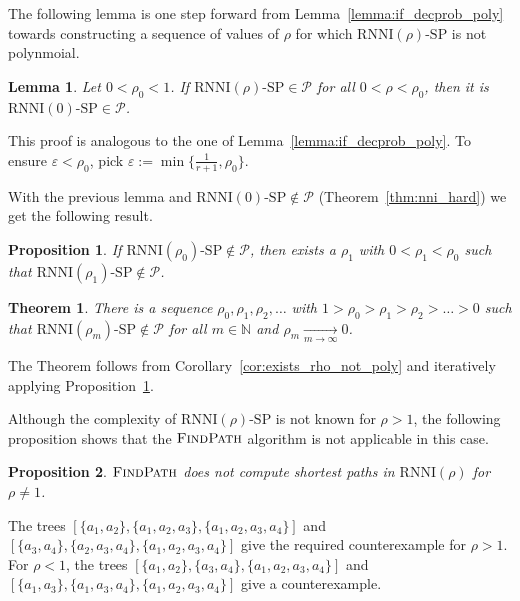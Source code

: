 \documentclass[11pt]{amsart}
\newtheorem{proposition}{Proposition}
\newtheorem{theorem}{Theorem}
\newtheorem{lemma}{Lemma}
\newcommand{\rnni}{\mathrm{RNNI}}
\newcommand{\findpath}{\textsc{FindPath}}
\newcommand{\p}{\mathcal{P}}
\newcommand{\decprob}[1]{\rnni(#1)\text{-}\mathrm{SP}}
\renewcommand{\epsilon}{\varepsilon}
\newcommand{\summary}[1]{} %
\begin{document}
\summary{Finding a sequence of $\rho$s converging to zero for which the problem is not in $\p$.}

The following lemma is one step forward from Lemma~\ref{lemma:if_decprob_poly} towards constructing a sequence of values of $\rho$ for which $\decprob{\rho}$ is not polynmoial.

\begin{lemma}
    Let $0 < \rho_0 < 1$.
    If $\decprob{\rho} \in \p$ for all $0<\rho<\rho_0$, then it is ${\decprob{0} \in \p}$.
\end{lemma}

\proof
	This proof is analogous to the one of Lemma~\ref{lemma:if_decprob_poly}.
	To ensure $\epsilon < \rho_0$, pick $\epsilon := \min\{\frac{1}{r + 1}, \rho_0\}$.
\endproof

With the previous lemma and $\decprob{0} \notin \p$ (Theorem~\ref{thm:nni_hard}) we get the following result.

\begin{proposition}
    If $\decprob{\rho_0} \notin \p$, then exists a $\rho_1$ with $0 < \rho_1 < \rho_0$ such that ${\decprob{\rho_1} \notin \p}$.
    \label{proposition:more_rho_not_poly}
\end{proposition}

\begin{theorem}
    There is a sequence $\rho_0, \rho_1, \rho_2, \ldots$ with $1 > \rho_0 > \rho_1 > \rho_2 > \ldots > 0$ such that $\decprob{\rho_m} \notin \p$ for all $m \in \mathbb N$ and $\rho_m \underset{m \rightarrow \infty}{\longrightarrow} 0$.
\end{theorem}

\proof
    The Theorem follows from Corollary~\ref{cor:exists_rho_not_poly} and iteratively applying Proposition~\ref{proposition:more_rho_not_poly}.
\endproof

Although the complexity of $\decprob{\rho}$ is not known for $\rho > 1$, the following proposition shows that the $\findpath$ algorithm is not applicable in this case.

\begin{proposition}
$\findpath$ does not compute shortest paths in $\rnni(\rho)$ for $\rho \neq 1$.
\label{prop:complexity_above_rnni}
\end{proposition}

\proof
The trees $[\{a_1,a_2\},\{a_1,a_2,a_3\},\{a_1,a_2,a_3,a_4\}]$ and $[\{a_3,a_4\},\{a_2,a_3,a_4\},\{a_1,a_2,a_3,a_4\}]$ give the required counterexample for $\rho > 1$.
For $\rho < 1$, the trees $[\{a_1,a_2\},\{a_3,a_4\},\{a_1,a_2,a_3,a_4\}]$ and $[\{a_1,a_3\},\{a_1,a_3, a_4\},\{a_1,a_2,a_3,a_4\}]$ give a counterexample.
\endproof
\end{document}
